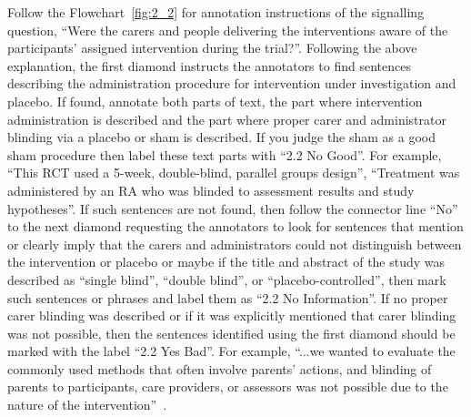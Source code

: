 \documentclass[sn-mathphys,Numbered]{sn-jnl}%
\begin{document}
Follow the Flowchart~\ref{fig:2_2} for annotation instructions of the signalling question, ``Were the carers and people delivering the interventions aware of the participants' assigned intervention during the trial?''.
Following the above explanation, the first diamond instructs the annotators to find sentences describing the administration procedure for intervention under investigation and placebo. 
If found, annotate both parts of text, the part where intervention administration is described and the part where proper carer and administrator blinding via a placebo or sham is described.
If you judge the sham as a good sham procedure then label these text parts with ``2.2 No Good''.
For example, ``This RCT used a 5-week, double-blind, parallel groups design'', ``Treatment was administered by an RA who was blinded to assessment results and study hypotheses''\cite{chiaravalloti2020efficacy}.
If such sentences are not found, then follow the connector line ``No'' to the next diamond requesting the annotators to look for sentences that mention or clearly imply that the carers and administrators could not distinguish between the intervention or placebo or maybe if the title and abstract of the study was described as ``single blind'', ``double blind'',  or ``placebo-controlled'', then mark such sentences or phrases and label them as ``2.2 No Information''. 
If no proper carer blinding was described or if it was explicitly mentioned that carer blinding was not possible, then the sentences identified using the first diamond should be marked with the label ``2.2 Yes Bad''.
For example, ``...we wanted to evaluate the commonly used methods that often involve parents’ actions, and blinding of parents to participants, care providers, or assessors was not possible due to the nature of the intervention''~\cite{andersson2020effect}.
\end{document}
